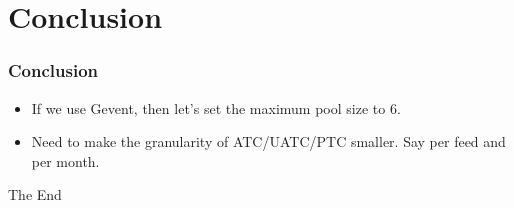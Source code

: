 \documentclass{beamer}
\begin{document}
\section{Conclusion}
\begin{frame}
\frametitle{Conclusion}
\begin{itemize}
\item If we use Gevent, then let's set the maximum pool size to 6.
\item Need to make the granularity of ATC/UATC/PTC smaller. Say per feed and per month.
\end{itemize}
\end{frame}



\begin{frame}
\Huge{\centerline{The End}}
\end{frame}

\end{document}
